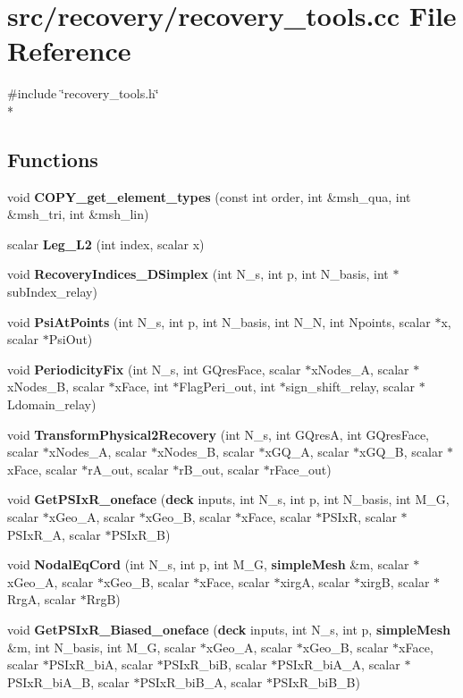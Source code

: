 \section{src/recovery/recovery\-\_\-tools.cc File Reference}
\label{recovery__tools_8cc}
{\ttfamily \#include \char`\"{}recovery\-\_\-tools.\-h\char`\"{}}\\*
\subsection*{Functions}
\begin{DoxyCompactItemize}
\item 
void {\bfseries C\-O\-P\-Y\-\_\-get\-\_\-element\-\_\-types} (const int order, int \&msh\-\_\-qua, int \&msh\-\_\-tri, int \&msh\-\_\-lin)\label{recovery__tools_8cc_ab380f73205a4cfd9640a45dbe7e98ce2}

\item 
scalar {\bf Leg\-\_\-\-L2} (int index, scalar x)
\item 
void {\bf Recovery\-Indices\-\_\-D\-Simplex} (int N\-\_\-s, int p, int N\-\_\-basis, int $\ast$sub\-Index\-\_\-relay)
\item 
void {\bf Psi\-At\-Points} (int N\-\_\-s, int p, int N\-\_\-basis, int N\-\_\-\-N, int Npoints, scalar $\ast$x, scalar $\ast$Psi\-Out)
\item 
void {\bf Periodicity\-Fix} (int N\-\_\-s, int G\-Qres\-Face, scalar $\ast$x\-Nodes\-\_\-\-A, scalar $\ast$x\-Nodes\-\_\-\-B, scalar $\ast$x\-Face, int $\ast$Flag\-Peri\-\_\-out, int $\ast$sign\-\_\-shift\-\_\-relay, scalar $\ast$Ldomain\-\_\-relay)
\item 
void {\bf Transform\-Physical2\-Recovery} (int N\-\_\-s, int G\-Qres\-A, int G\-Qres\-Face, scalar $\ast$x\-Nodes\-\_\-\-A, scalar $\ast$x\-Nodes\-\_\-\-B, scalar $\ast$x\-G\-Q\-\_\-\-A, scalar $\ast$x\-G\-Q\-\_\-\-B, scalar $\ast$x\-Face, scalar $\ast$r\-A\-\_\-out, scalar $\ast$r\-B\-\_\-out, scalar $\ast$r\-Face\-\_\-out)
\item 
void {\bf Get\-P\-S\-Ix\-R\-\_\-oneface} ({\bf deck} inputs, int N\-\_\-s, int p, int N\-\_\-basis, int M\-\_\-\-G, scalar $\ast$x\-Geo\-\_\-\-A, scalar $\ast$x\-Geo\-\_\-\-B, scalar $\ast$x\-Face, scalar $\ast$P\-S\-Ix\-R, scalar $\ast$P\-S\-Ix\-R\-\_\-\-A, scalar $\ast$P\-S\-Ix\-R\-\_\-\-B)
\item 
void {\bf Nodal\-Eq\-Cord} (int N\-\_\-s, int p, int M\-\_\-\-G, {\bf simple\-Mesh} \&m, scalar $\ast$x\-Geo\-\_\-\-A, scalar $\ast$x\-Geo\-\_\-\-B, scalar $\ast$x\-Face, scalar $\ast$xirg\-A, scalar $\ast$xirg\-B, scalar $\ast$Rrg\-A, scalar $\ast$Rrg\-B)
\item 
void {\bf Get\-P\-S\-Ix\-R\-\_\-\-Biased\-\_\-oneface} ({\bf deck} inputs, int N\-\_\-s, int p, {\bf simple\-Mesh} \&m, int N\-\_\-basis, int M\-\_\-\-G, scalar $\ast$x\-Geo\-\_\-\-A, scalar $\ast$x\-Geo\-\_\-\-B, scalar $\ast$x\-Face, scalar $\ast$P\-S\-Ix\-R\-\_\-bi\-A, scalar $\ast$P\-S\-Ix\-R\-\_\-bi\-B, scalar $\ast$P\-S\-Ix\-R\-\_\-bi\-A\-\_\-\-A, scalar $\ast$P\-S\-Ix\-R\-\_\-bi\-A\-\_\-\-B, scalar $\ast$P\-S\-Ix\-R\-\_\-bi\-B\-\_\-\-A, scalar $\ast$P\-S\-Ix\-R\-\_\-bi\-B\-\_\-\-B)
\end{DoxyCompactItemize}


